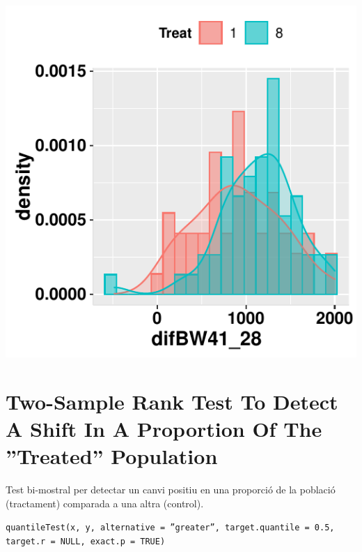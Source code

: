 \documentclass[11pt,a4paper]{article}\usepackage[]{graphicx}\usepackage[]{color}
\makeatletter
\def\maxwidth{ %
  \ifdim\Gin@nat@width>\linewidth
    \linewidth
  \else
    \Gin@nat@width
  \fi
}
\newenvironment{knitrout}{}{} %
\makeatother
\begin{document}
\begin{center}
\begin{knitrout}
\color{fgcolor}
\includegraphics[width=\maxwidth]{figure/unnamed-chunk-13-1} 

\end{knitrout}
\end{center}


\clearpage
\section{Two-Sample Rank Test To Detect A Shift In A Proportion Of The ''Treated'' Population}



Test bi-mostral per detectar un canvi positiu en una proporció de la població (tractament) comparada a una altra (control).

\texttt{quantileTest(x, y, alternative = ''greater'', target.quantile = 0.5, target.r = NULL, exact.p = TRUE)}
    
\end{document}
